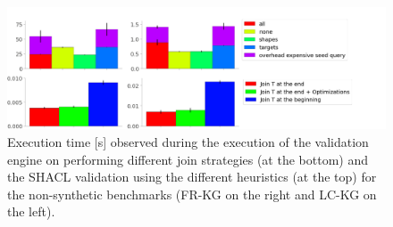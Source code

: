 \begin{figure}
    \centering
    \includegraphics[width = \textwidth, trim=0 0 90 35,clip]{images/evaluation/join_shacl.png}
    \caption{Execution time [s] observed during the execution of the validation engine on performing different join strategies (at the bottom) and the SHACL validation using the different heuristics (at the top) for the non-synthetic benchmarks (FR-KG on the right and LC-KG on the left).}
    \label{fig:join_shacl_real_world_application}
\end{figure}

